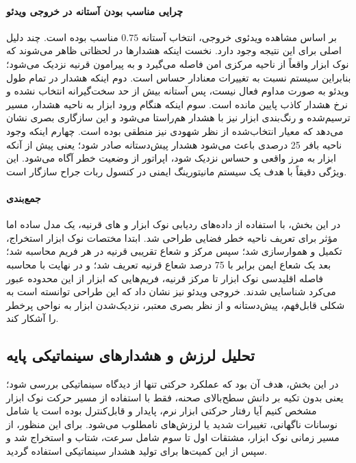 \documentclass{article}
\begin{document}
\paragraph{چرایی مناسب بودن آستانه در خروجی ویدئو}
بر اساس مشاهده ویدئوی خروجی، انتخاب آستانه \(0.75\) مناسب بوده است. چند دلیل اصلی برای این نتیجه وجود دارد. نخست اینکه هشدارها در لحظاتی ظاهر می‌شوند که نوک ابزار واقعاً از ناحیه مرکزی امن فاصله می‌گیرد و به پیرامون قرنیه نزدیک می‌شود؛ بنابراین سیستم نسبت به تغییرات معنادار حساس است. دوم اینکه هشدار در تمام طول ویدئو به صورت مداوم فعال نیست، پس آستانه بیش از حد سخت‌گیرانه انتخاب نشده و نرخ هشدار کاذب پایین مانده است. سوم اینکه هنگام ورود ابزار به ناحیه هشدار، مسیر ترسیم‌شده و رنگ‌بندی ابزار نیز با هشدار هم‌راستا می‌شود و این سازگاری بصری نشان می‌دهد که معیار انتخاب‌شده از نظر شهودی نیز منطقی بوده است. چهارم اینکه وجود ناحیه بافر 25 درصدی باعث می‌شود هشدار پیش‌دستانه صادر شود؛ یعنی پیش از آنکه ابزار به مرز واقعی و حساس نزدیک شود، اپراتور از وضعیت خطر آگاه می‌شود. این ویژگی دقیقاً با هدف یک سیستم مانیتورینگ ایمنی در کنسول ربات جراح سازگار است.

\paragraph{جمع‌بندی}
در این بخش، با استفاده از داده‌های ردیابی نوک ابزار و های قرنیه، یک مدل ساده اما مؤثر برای تعریف ناحیه خطر فضایی طراحی شد. ابتدا مختصات نوک ابزار استخراج، تکمیل و هموارسازی شد؛ سپس مرکز و شعاع تقریبی قرنیه در هر فریم محاسبه شد؛ بعد یک شعاع ایمن برابر با 75 درصد شعاع قرنیه تعریف شد؛ و در نهایت با محاسبه فاصله اقلیدسی نوک ابزار تا مرکز قرنیه، فریم‌هایی که ابزار از این محدوده عبور می‌کرد شناسایی شدند. خروجی ویدئو نیز نشان داد که این طراحی توانسته است به شکلی قابل‌فهم، پیش‌دستانه و از نظر بصری معتبر، نزدیک‌شدن ابزار به نواحی پرخطر را آشکار کند.

\subsection{تحلیل لرزش و هشدارهای سینماتیکی پایه}


در این بخش، هدف آن بود که عملکرد حرکتی  تنها از دیدگاه سینماتیکی بررسی شود؛ یعنی بدون تکیه بر دانش سطح‌بالای صحنه، فقط با استفاده از مسیر حرکت نوک ابزار مشخص کنیم آیا رفتار حرکتی ابزار نرم، پایدار و قابل‌کنترل بوده است یا شامل نوسانات ناگهانی، تغییرات شدید یا لرزش‌های نامطلوب می‌شود. برای این منظور، از مسیر زمانی نوک ابزار، مشتقات اول تا سوم شامل سرعت، شتاب و  استخراج شد و سپس از این کمیت‌ها برای تولید هشدار سینماتیکی استفاده گردید.
\end{document}
